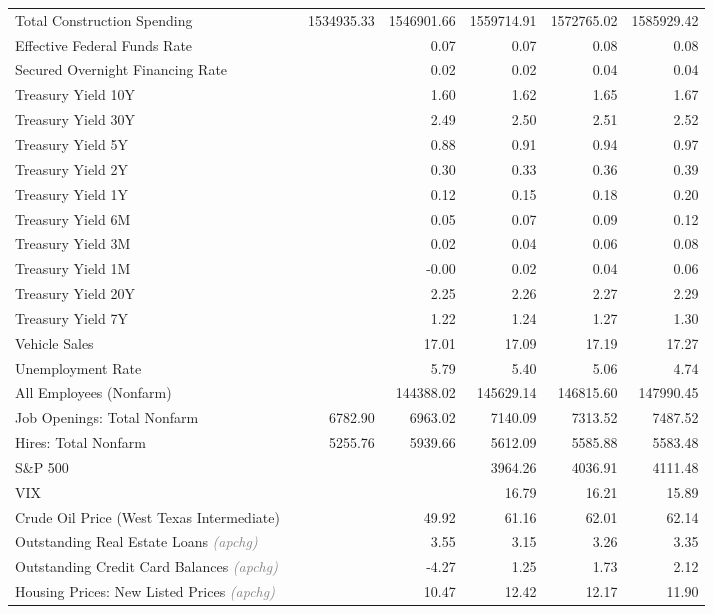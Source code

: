 \documentclass[11pt, letterpaper]{article}\usepackage[]{graphicx}\usepackage[]{color}
\begin{document}
\begin{table}[H]
\begin{tabular}{lrrrrrr}
  Total Construction Spending &  & 1534935.33 & 1546901.66 & 1559714.91 & 1572765.02 & 1585929.42 \\ 
  Effective Federal Funds Rate &  &  & 0.07 & 0.07 & 0.08 & 0.08 \\ 
  Secured Overnight Financing Rate &  &  & 0.02 & 0.02 & 0.04 & 0.04 \\ 
  Treasury Yield 10Y &  &  & 1.60 & 1.62 & 1.65 & 1.67 \\ 
  Treasury Yield 30Y &  &  & 2.49 & 2.50 & 2.51 & 2.52 \\ 
  Treasury Yield 5Y &  &  & 0.88 & 0.91 & 0.94 & 0.97 \\ 
  Treasury Yield 2Y &  &  & 0.30 & 0.33 & 0.36 & 0.39 \\ 
  Treasury Yield 1Y &  &  & 0.12 & 0.15 & 0.18 & 0.20 \\ 
  Treasury Yield 6M &  &  & 0.05 & 0.07 & 0.09 & 0.12 \\ 
  Treasury Yield 3M &  &  & 0.02 & 0.04 & 0.06 & 0.08 \\ 
  Treasury Yield 1M &  &  & -0.00 & 0.02 & 0.04 & 0.06 \\ 
  Treasury Yield 20Y &  &  & 2.25 & 2.26 & 2.27 & 2.29 \\ 
  Treasury Yield 7Y &  &  & 1.22 & 1.24 & 1.27 & 1.30 \\ 
  Vehicle Sales &  &  & 17.01 & 17.09 & 17.19 & 17.27 \\ 
  Unemployment Rate &  &  & 5.79 & 5.40 & 5.06 & 4.74 \\ 
  All Employees (Nonfarm) &  &  & 144388.02 & 145629.14 & 146815.60 & 147990.45 \\ 
  Job Openings: Total Nonfarm &  & 6782.90 & 6963.02 & 7140.09 & 7313.52 & 7487.52 \\ 
  Hires: Total Nonfarm &  & 5255.76 & 5939.66 & 5612.09 & 5585.88 & 5583.48 \\ 
  S\&P 500 &  &  &  & 3964.26 & 4036.91 & 4111.48 \\ 
  VIX &  &  &  & 16.79 & 16.21 & 15.89 \\ 
  Crude Oil Price (West Texas Intermediate) &  &  & 49.92 & 61.16 & 62.01 & 62.14 \\ 
  Outstanding Real Estate Loans \textit{\footnotesize\textcolor{gray}{(apchg)}} &  &  & 3.55 & 3.15 & 3.26 & 3.35 \\ 
  Outstanding Credit Card Balances \textit{\footnotesize\textcolor{gray}{(apchg)}} &  &  & -4.27 & 1.25 & 1.73 & 2.12 \\ 
  Housing Prices: New Listed Prices \textit{\footnotesize\textcolor{gray}{(apchg)}} &  &  & 10.47 & 12.42 & 12.17 & 11.90 \\ 

\end{tabular}
\end{table}
\end{document}
